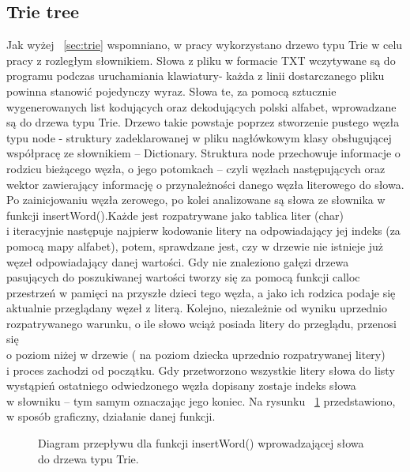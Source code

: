 \documentclass[twoside,a4paper]{book}
\begin{document}
\subsection{Trie tree}\label{sec:trietree}
Jak wyżej ~\ref{sec:trie}  wspomniano, w pracy wykorzystano drzewo typu Trie w celu pracy z rozległym słownikiem. Słowa z pliku w formacie TXT wczytywane są do programu podczas uruchamiania klawiatury- każda z linii dostarczanego pliku powinna stanowić pojedynczy wyraz. Słowa te, za pomocą sztucznie wy\-ge\-ne\-ro\-wa\-nych list kodujących oraz dekodujących polski alfabet, wprowadzane są do drzewa typu Trie. Drzewo takie powstaje poprzez stworzenie pustego węzła typu node - struktury zadeklarowanej w pliku nagłówkowym klasy obsługującej współpracę ze słownikiem – Dictionary. Struktura node przechowuje informacje o rodzicu bieżącego węzła, o jego potomkach – czyli węzłach następujących oraz wektor zawierający informację o przynależności danego węzła literowego do słowa. 
Po zainicjowaniu węzła zerowego, po kolei analizowane są słowa ze sło\-wni\-ka w funkcji insertWord().Każde jest rozpatrywane jako tablica liter (char) \\i iteracyjnie następuje najpierw kodowanie litery na odpowiadający jej indeks (za pomocą  mapy alfabet), potem, sprawdzane jest, czy w drzewie nie istnieje już węzeł odpowiadający danej wartości. Gdy nie znaleziono gałęzi drzewa pasujących do poszukiwanej wartości tworzy się za pomocą funkcji calloc przestrzeń w pamięci na przyszłe dzieci tego węzła, a jako ich rodzica podaje się aktualnie przeglądany węzeł z literą. Kolejno, niezależnie od wyniku uprzednio rozpatrywanego warunku, o ile słowo wciąż posiada litery do przeglądu, przenosi się \\o poziom niżej w drzewie ( na poziom dziecka  uprzednio rozpatrywanej litery) \\i proces zachodzi od początku.  Gdy przetworzono wszystkie litery słowa do listy wystąpień ostatniego odwiedzonego węzła dopisany zostaje indeks słowa \\w słowniku – tym samym oznaczając jego koniec. Na rysunku ~\ref{fig:insertWord} przed\-sta\-wio\-no, w sposób graficzny, działanie danej funkcji.
\begin{figure}[!h]
		\centering
		\caption{Diagram przepływu dla funkcji insertWord() wprowadzającej słowa do drzewa typu Trie. }
		\label{fig:insertWord}
\end{figure}
\end{document}
